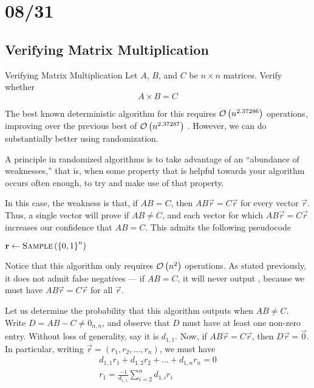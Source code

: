 \section{08/31}
\subsection{Verifying Matrix Multiplication}
\begin{problem}{Verifying Matrix Multiplication}{}
    Let $A$, $B$, and $C$ be $n \times n$ matrices. Verify whether
    \[A \times B = C\]
\end{problem}
The best known deterministic algorithm for this requires $\mathcal{O}\left(n^{2.37286}\right)$
operations, improving over the previous best of $\mathcal{O}\left(n^{2.37287}\right)$
\cite{alman2020refined}. However, we can do substantially better using
randomization.

A principle in randomized algorithms is to take advantage of an ``abundance of
weaknesses,'' that is, when some property that is helpful towards your algorithm
occurs often enough, to try and make use of that property.

In this case, the weakness is that, if $AB = C$, then $AB\vec{r} = C\vec{r}$ for
every vector $\vec{r}$. Thus, a single vector will prove if $AB \neq C$, and
each vector for which $AB\vec{r} = C\vec{r}$ increases our confidence that $AB =
C$. This admits the following pseudocode
\begin{algorithm}
    \caption{Verify Matrix Multiplication}
    \begin{algorithmic}[1]
            \State $\vec{r} \gets \Call{Sample}{\set{0,1}^n}$
                \State \Return \False
            \Else
                \State \Return \True
            \EndIf
        \EndFunction
    \end{algorithmic}
\end{algorithm}
Notice that this algorithm only requires $\mathcal{O}\left(n^2\right)$ operations. As stated
previously, it does not admit false negatives --- if $AB = C$, it will never
output \False, because we must have $AB\vec{r} = C\vec{r}$ for all $\vec{r}$.

Let us determine the probability that this algorithm outputs \True when $AB \neq
C$. Write $D = AB - C \neq 0_{n,n}$, and observe that $D$ must have at least one
non-zero entry. Without loss of generality, say it is $d_{1,1}$. Now, if
$AB\vec{r} = C\vec{r}$, then $D\vec{r} = \vec{0}$. In particular, writing
$\vec{r} = (r_1, r_2, \dots, r_n)$, we must have
\begin{align*}
    d_{1,1}r_1 + d_{1,2}r_2 + \dots + d_{1,n}r_n = 0\\
    r_1 = \frac{-1}{d_{1,1}}\sum_{i=2}^n d_{1,i}r_i
\end{align*}

